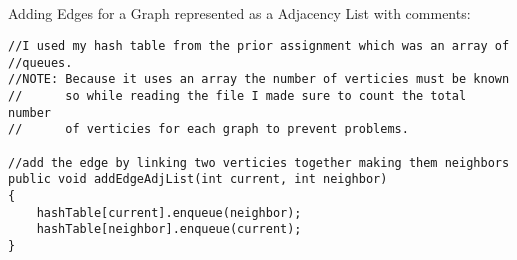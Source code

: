 \documentclass[letterpaper, 10pt]{article}
\begin{document}
\subsection{}
Adding Edges for a Graph represented as a Adjacency List with comments: \\
\begin{lstlisting}
//I used my hash table from the prior assignment which was an array of
//queues.
//NOTE: Because it uses an array the number of verticies must be known
//      so while reading the file I made sure to count the total number
//      of verticies for each graph to prevent problems.

//add the edge by linking two verticies together making them neighbors
public void addEdgeAdjList(int current, int neighbor)
{
    hashTable[current].enqueue(neighbor);
    hashTable[neighbor].enqueue(current);
}
\end{lstlisting}
\end{document}
